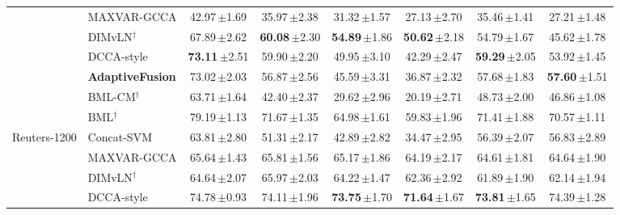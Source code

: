 \begin{table}[!t]
\begin{tabular}{llcccccc}
 & MAXVAR-GCCA & 42.97\,{\scriptsize$\pm$1.69} & 35.97\,{\scriptsize$\pm$2.38} & 31.32\,{\scriptsize$\pm$1.57} & 27.13\,{\scriptsize$\pm$2.70} & 35.46\,{\scriptsize$\pm$1.41} & 27.21\,{\scriptsize$\pm$1.48} \\
 & DIMvLN$^\dagger$ & 67.89\,{\scriptsize$\pm$2.62} & \textbf{60.08}\,{\scriptsize$\pm$2.30} & \textbf{54.89}\,{\scriptsize$\pm$1.86} & \textbf{50.62}\,{\scriptsize$\pm$2.18} & 54.79\,{\scriptsize$\pm$1.67} & 45.62\,{\scriptsize$\pm$1.78} \\
 & DCCA-style & \textbf{73.11}\,{\scriptsize$\pm$2.51} & 59.90\,{\scriptsize$\pm$2.20} & 49.95\,{\scriptsize$\pm$3.10} & 42.29\,{\scriptsize$\pm$2.47} & \textbf{59.29}\,{\scriptsize$\pm$2.05} & 53.92\,{\scriptsize$\pm$1.45} \\
 & \textbf{AdaptiveFusion} & 73.02\,{\scriptsize$\pm$2.03} & 56.87\,{\scriptsize$\pm$2.56} & 45.59\,{\scriptsize$\pm$3.31} & 36.87\,{\scriptsize$\pm$2.32} & 57.68\,{\scriptsize$\pm$1.83} & \textbf{57.60}\,{\scriptsize$\pm$1.51} \\
\cmidrule(lr){2-8}
 & BML-CM$^\dagger$ & 63.71\,{\scriptsize$\pm$1.64} & 42.40\,{\scriptsize$\pm$2.37} & 29.62\,{\scriptsize$\pm$2.96} & 20.19\,{\scriptsize$\pm$2.71} & 48.73\,{\scriptsize$\pm$2.00} & 46.86\,{\scriptsize$\pm$1.08} \\
 & BML$^\dagger$ & 79.19\,{\scriptsize$\pm$1.13} & 71.67\,{\scriptsize$\pm$1.35} & 64.98\,{\scriptsize$\pm$1.61} & 59.83\,{\scriptsize$\pm$1.96} & 71.41\,{\scriptsize$\pm$1.88} & 70.57\,{\scriptsize$\pm$1.11} \\
\midrule
\multirow{7}{*}{Reuters-1200} & Concat-SVM & 63.81\,{\scriptsize$\pm$2.80} & 51.31\,{\scriptsize$\pm$2.17} & 42.89\,{\scriptsize$\pm$2.82} & 34.47\,{\scriptsize$\pm$2.95} & 56.39\,{\scriptsize$\pm$2.07} & 56.83\,{\scriptsize$\pm$2.89} \\
 & MAXVAR-GCCA & 65.64\,{\scriptsize$\pm$1.43} & 65.81\,{\scriptsize$\pm$1.56} & 65.17\,{\scriptsize$\pm$1.86} & 64.19\,{\scriptsize$\pm$2.17} & 64.61\,{\scriptsize$\pm$1.81} & 64.64\,{\scriptsize$\pm$1.90} \\
 & DIMvLN$^\dagger$ & 64.64\,{\scriptsize$\pm$2.07} & 65.97\,{\scriptsize$\pm$2.03} & 64.22\,{\scriptsize$\pm$1.47} & 62.36\,{\scriptsize$\pm$2.92} & 61.89\,{\scriptsize$\pm$1.90} & 62.14\,{\scriptsize$\pm$1.94} \\
 & DCCA-style & 74.78\,{\scriptsize$\pm$0.93} & 74.11\,{\scriptsize$\pm$1.96} & \textbf{73.75}\,{\scriptsize$\pm$1.70} & \textbf{71.64}\,{\scriptsize$\pm$1.67} & \textbf{73.81}\,{\scriptsize$\pm$1.65} & 74.39\,{\scriptsize$\pm$1.28} \\

\end{tabular}
\end{table}
